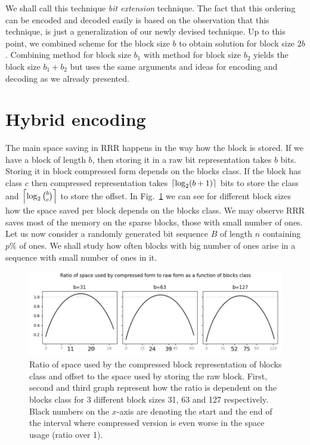 We shall call this technique \textit{bit extension} technique. The fact that this
ordering can be encoded and decoded easily is based on the observation that this technique,
is just a generalization of our newly devised technique. Up to this point, we combined
scheme for the block size $b$ to obtain solution for block size $2b$. Combining method
for block size $b_1$ with method for block size $b_2$ yields the block size $b_1+b_2$
but uses the same arguments and ideas for encoding and decoding as we already presented. 

\section{Hybrid encoding}


The main space saving in RRR happens in the way how the block is stored. If we have
a block of length $b$, then storing it in a raw bit representation takes $b$ bits.
Storing it in block compressed form depends on the blocks class. If the block
has class $c$ then compressed representation takes $\left\lceil \log_2 (b+1) \right\rceil$ bits to store the
class and $\left\lceil \log_2{b\choose c} \right\rceil$ to store the offset. In
Fig.~\ref{obr:rrrSpaceSavings} we can see for different block sizes how the space saved
per block depends on the blocks class. We may observe RRR saves most of the memory on the
sparse blocks, those with small number of ones. Let us now consider a randomly
generated bit sequence $B$ of length $n$ containing $p\%$ of ones. We shall study how
often blocks with big number of ones arise in a sequence with small number of ones in it.

\begin{figure}
	\centerline{
		\includegraphics[width=\textwidth]{images/rrr_space_savings}
	}
	\caption[TODO]{Ratio of space used by the compressed
    block representation of blocks class and offset to the space used by storing the raw
    block. First, second and third graph represent how the ratio is dependent on the blocks
    class for 3 different block sizes 31, 63 and 127 respectively. Black numbers on the $x$-axis
    are denoting the start and the end of the interval where compressed version is even worse
    in the space usage (ratio over 1).
	}
	\label{obr:rrrSpaceSavings}
\end{figure}

